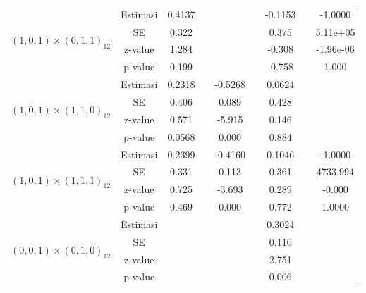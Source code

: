 \begin{enumerate}[label=\alph*.]
\begin{longtable}{|c|c|c|c|c|c|c|c|c|}
            \multirow{4}{*}{$(1,0,1)\times(0,1,1)_{12}$}
            & Estimasi & 0.4137  & {} & {} & {} & -0.1153 & {} & -1.0000\\ \cline{2-9}
            & SE       & 0.322 & {} & {} & {} & 0.375 & {} & 5.11e+05\\ \cline{2-9}
            & z-value  & 1.284  & {} & {} & {} & -0.308 & {}& -1.96e-06\\ \cline{2-9}
            & p-value  & 0.199 & {} & {} & {} & -0.758 & {} & 1.000\\ \hline

            \multirow{4}{*}{$(1,0,1)\times(1,1,0)_{12}$}
            & Estimasi & 0.2318  & {} & -0.5268 & {} & 0.0624 & {} & {}\\ \cline{2-9}
            & SE       & 0.406 & {} & 0.089 & {} & 0.428 & {} & {}\\ \cline{2-9}
            & z-value  & 0.571  & {} & -5.915 & {} & 0.146 & {}& {}\\ \cline{2-9}
            & p-value  & 0.0568 & {} & 0.000 & {} & 0.884 & {} & {}\\ \hline

            \multirow{4}{*}{$(1,0,1)\times(1,1,1)_{12}$}
            & Estimasi & 0.2399  & {} & -0.4160 & {} & 0.1046 & {} & -1.0000\\ \cline{2-9}
            & SE       & 0.331 & {} & 0.113 & {} & 0.361 & {} & 4733.994\\ \cline{2-9}
            & z-value  & 0.725  & {} & -3.693 & {} & 0.289 & {}& -0.000\\ \cline{2-9}
            & p-value  & 0.469 & {} & 0.000 & {} & 0.772 & {} & 1.0000\\ \hline

            \multirow{4}{*}{$(0,0,1)\times(0,1,0)_{12}$}
            & Estimasi & {} & {} & {} & {} & 0.3024 & {} & {}\\ \cline{2-9}
            & SE       & {} & {} & {} & {} & 0.110 & {} & {}\\ \cline{2-9}
            & z-value  & {} & {} & {} & {} & 2.751 & {}& {}\\ \cline{2-9}
            & p-value  & {} & {} & {} & {} & 0.006 & {} & {}\\ \hline


\end{longtable}
\end{enumerate}
